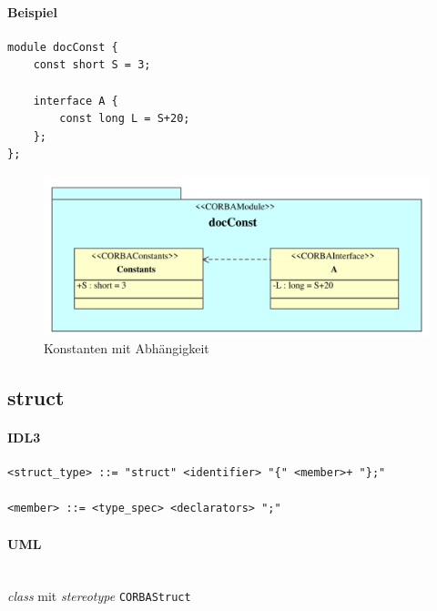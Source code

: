 \documentclass [a4paper,10pt] {scrartcl}
\begin{document}
\paragraph{Beispiel}
\begin{verbatim}
module docConst {
    const short S = 3;

    interface A {
        const long L = S+20;
    };
};
\end{verbatim}
\begin{figure}[!h]
\centerline{\includegraphics[width=\linewidth]{docConst}}
\caption{Konstanten mit Abh{\"a}ngigkeit}
\label{fig:const}
\end{figure}

\cleardoublepage
\subsection{struct}
\paragraph{IDL3}
\begin{verbatim}
<struct_type> ::= "struct" <identifier> "{" <member>+ "};"

<member> ::= <type_spec> <declarators> ";"
\end{verbatim}
\paragraph{UML}~\\
\emph{class} mit \emph{stereotype} \texttt{CORBAStruct}\\
\end{document}
